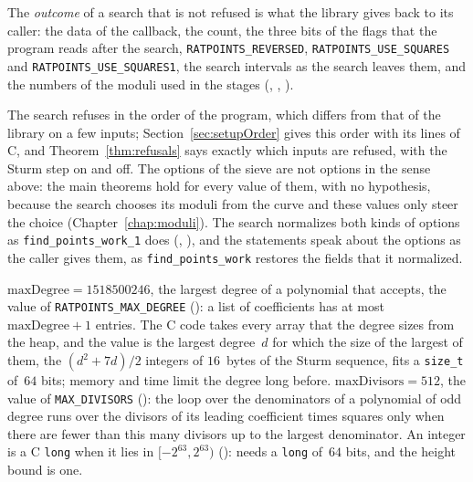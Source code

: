\begin{definition}
  The \emph{outcome} of a search that is not refused is what the library gives back to its caller:
  the data of the callback, the count, the three bits of the flags that the program reads after the
  search, \verb|RATPOINTS_REVERSED|, \verb|RATPOINTS_USE_SQUARES| and \verb|RATPOINTS_USE_SQUARES1|,
  the search intervals as the search leaves them, and the numbers of the moduli used in the stages
  (, ,
  ).
\end{definition}

The search refuses in the order of the program, which differs from that of the library on a few
inputs; Section~\ref{sec:setupOrder} gives this order with its lines of C, and
Theorem~\ref{thm:refusals} says exactly which inputs are refused, with the Sturm step on and off.
The options of the sieve are not options in the sense above: the main theorems hold for every value
of them, with no hypothesis, because the search chooses its moduli from the curve and these values
only steer the choice (Chapter~\ref{chap:moduli}). The search normalizes both kinds of options as
\verb|find_points_work_1| does (,
), and the statements speak about the options as the caller
gives them, as \verb|find_points_work| restores the fields that it normalized.

\begin{definition}\label{def:maxDegree}
  \leanok
  $\mathrm{maxDegree} = 1518500246$, the largest degree of a polynomial that \ratpoints{} accepts,
  the value of \verb|RATPOINTS_MAX_DEGREE| (): a list of coefficients
  has at most $\mathrm{maxDegree} + 1$ entries. The C code takes every array that the degree sizes
  from the heap, and the value is the largest degree~$d$ for which the size of the largest of them,
  the $(d^2 + 7d)/2$ integers of $16$~bytes of the Sturm sequence, fits a \verb|size_t|
  of~$64$ bits; memory and time limit the degree long before. $\mathrm{maxDivisors} = 512$, the
  value of
  \verb|MAX_DIVISORS| (): the loop over the denominators of a
  polynomial of odd degree runs over the divisors of its leading coefficient times squares only when
  there are fewer than this many divisors up to the largest denominator. An integer is a C
  \verb|long| when it lies in $[-2^{63}, 2^{63})$ (): \ratpoints{} needs
  a \verb|long| of~$64$ bits, and the height bound is one.
\end{definition}

